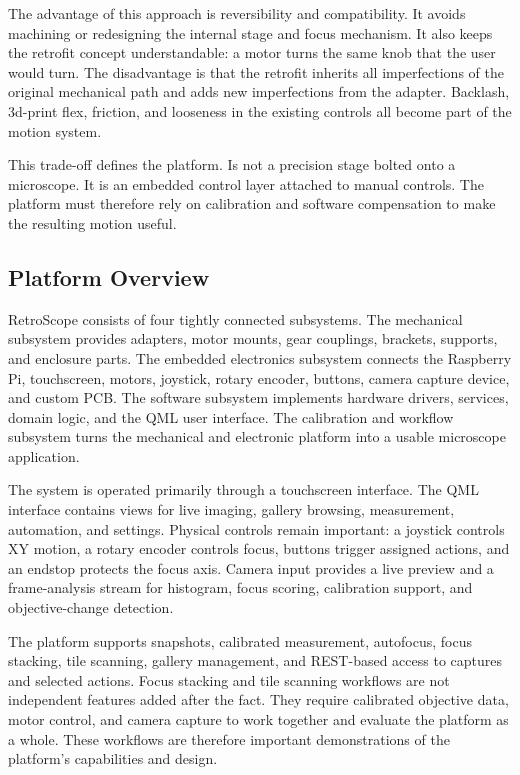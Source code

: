 The advantage of this approach is reversibility and compatibility. It avoids machining or redesigning the internal stage and focus mechanism. It also keeps the retrofit concept understandable: a motor turns the same knob that the user would turn. The disadvantage is that the retrofit inherits all imperfections of the original mechanical path and adds new imperfections from the adapter. Backlash, 3d-print flex, friction, and looseness in the existing controls all become part of the motion system.

This trade-off defines the platform. Is not a precision stage bolted onto a microscope. It is an embedded control layer attached to manual controls. The platform must therefore rely on calibration and software compensation to make the resulting motion useful.

\subsection{Platform Overview}

RetroScope consists of four tightly connected subsystems. The mechanical subsystem provides adapters, motor mounts, gear couplings, brackets, supports, and enclosure parts. The embedded electronics subsystem connects the Raspberry Pi, touchscreen, motors, joystick, rotary encoder, buttons, camera capture device, and custom PCB. The software subsystem implements hardware drivers, services, domain logic, and the QML user interface. The calibration and workflow subsystem turns the mechanical and electronic platform into a usable microscope application.

The system is operated primarily through a touchscreen interface. The QML interface contains views for live imaging, gallery browsing, measurement, automation, and settings. Physical controls remain important: a joystick controls XY motion, a rotary encoder controls focus, buttons trigger assigned actions, and an endstop protects the focus axis. Camera input provides a live preview and a frame-analysis stream for histogram, focus scoring, calibration support, and objective-change detection.

The platform supports snapshots, calibrated measurement, autofocus, focus stacking, tile scanning, gallery management, and REST-based access to captures and selected actions. Focus stacking and tile scanning workflows are not independent features added after the fact. They require calibrated objective data, motor control, and camera capture to work together and evaluate the platform as a whole. These workflows are therefore important demonstrations of the platform's capabilities and design.

